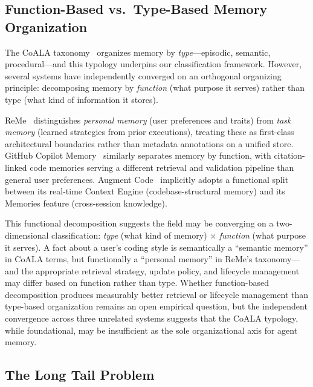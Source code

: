 \subsection{Function-Based vs.\ Type-Based Memory Organization}
\label{sec:function-vs-type}

The CoALA taxonomy~\cite{sumers2024coala} organizes memory by
\emph{type}---episodic, semantic, procedural---and this typology
underpins our classification framework.  However, several systems have
independently converged on an orthogonal organizing principle:
decomposing memory by \emph{function} (what purpose it serves) rather
than type (what kind of information it stores).

ReMe~\cite{reme2025} distinguishes \emph{personal memory} (user
preferences and traits) from \emph{task memory} (learned strategies from
prior executions), treating these as first-class architectural
boundaries rather than metadata annotations on a unified store.
GitHub Copilot Memory~\cite{copilot2026} similarly separates memory
by function, with citation-linked code memories serving a different
retrieval and validation pipeline than general user preferences.
Augment Code~\cite{augment2026} implicitly adopts a functional split
between its real-time Context Engine (codebase-structural memory) and
its Memories feature (cross-session knowledge).

This functional decomposition suggests the field may be converging on a
two-dimensional classification: \emph{type} (what kind of memory)
$\times$ \emph{function} (what purpose it serves).  A fact about a
user's coding style is semantically a ``semantic memory'' in CoALA
terms, but functionally a ``personal memory'' in ReMe's taxonomy---and
the appropriate retrieval strategy, update policy, and lifecycle
management may differ based on function rather than type.  Whether
function-based decomposition produces measurably better retrieval or
lifecycle management than type-based organization remains an open
empirical question, but the independent convergence across three
unrelated systems suggests that the CoALA typology, while foundational,
may be insufficient as the sole organizational axis for agent memory.

\subsection{The Long Tail Problem}
\label{sec:long-tail}

